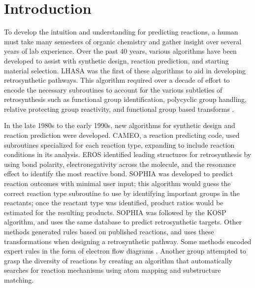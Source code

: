 

\section{Introduction}

To develop the intuition and understanding for predicting reactions, a human must take many semesters of organic chemistry and gather insight over several years of lab experience. Over the past 40 years, various algorithms have been developed to assist with synthetic design, reaction prediction, and starting material selection\cite{Todd_2005,Szymkuc_2016}. LHASA was the first of these algorithms to aid in developing retrosynthetic pathways\cite{Corey1971Centenary}. This algorithm required over a decade of effort to encode the necessary subroutines to account for the various subtleties of retrosynthesis such as functional group identification, polycyclic group handling, relative protecting group reactivity, and functional group based transforms \cite{corey1972techniques,corey1975general,corey1985computer,corey1972computer}. 

In the late 1980s to the early 1990s, new algorithms for synthetic design and reaction prediction were developed. CAMEO\cite{jorgensen1990cameo}, a reaction predicting code, used subroutines specialized for each reaction type, expanding to include reaction conditions in its analysis. EROS\cite{gasteiger1987new} identified leading structures for retrosynthesis by using bond polarity, electronegativity across the molecule, and the resonance effect to identify the most reactive bond. SOPHIA\cite{Satoh_1996} was developed to predict reaction outcomes with minimal user input; this algorithm would guess the correct reaction type subroutine to use by identifying important groups in the reactants; once the reactant type was identified, product ratios would be estimated for the resulting products. SOPHIA was followed by the KOSP algorithm, and uses the same database to predict retrosynthetic targets\cite{Satoh_1999}. Other methods generated rules based on published reactions, and uses these transformations when designing a retrosynthetic pathway\cite{ChemPlanner,Gelernter_1990}. Some methods encoded expert rules in the form of electron flow diagrams \cite{Baldi2009NoElectron,Chen2008SynExplorer}. Another group attempted to grasp the diversity of reactions by creating an algorithm that automatically searches for reaction mechanisms using atom mapping and substructure matching\cite{Law_2009}. 

